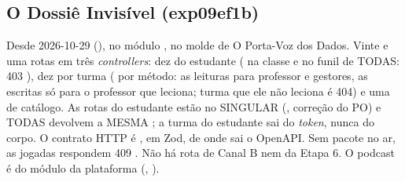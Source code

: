 \subsection{O Dossiê Invisível (exp09ef1b)}
\label{sec:api-dossie-invisivel}


Desde 2026-10-29 (), no módulo , no
molde de O Porta-Voz dos Dados. Vinte e uma rotas em três \emph{controllers}:
dez do estudante ( na classe e
 no funil de TODAS: 403 ),
dez por turma ( por método: as leituras para professor e
gestores, as escritas só para o professor que leciona; turma que ele não
leciona é 404) e uma de catálogo. As rotas do estudante estão no SINGULAR
(, correção do PO) e TODAS devolvem a
MESMA ; a turma do estudante sai do \emph{token}, nunca do
corpo. O contrato HTTP é , em Zod, de onde sai o
OpenAPI. Sem pacote no ar, as jogadas respondem 409
. Não há rota de Canal B nem da Etapa 6. O
podcast é do módulo da plataforma (,
).

